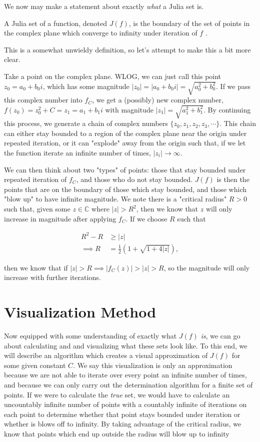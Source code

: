 \documentclass[12pt]{article}
\def\CC{{\mathbb C}}
\begin{document}
We now may make a statement about exactly \textit{what} a Julia set is. 

\begin{defin}
A Julia set of a function, denoted $J(f)$, is the boundary of the set of points in the complex plane which converge to infinity under iteration of $f$ \cite{Milnor}. 
\end{defin}

This is a somewhat unwieldy definition, so let's attempt to make this a bit more clear. 

Take a point on the complex plane. WLOG, we can just call this point $z_0 = a_0 + b_0i$, which has some magnitude $|z_0| = |a_0 + b_0i| = \sqrt{a_0^2 + b_0^2}$. If we pass this complex number into $f_C$, we get a (possibly) new complex number, $f(z_0) = z_0^2 + C = z_1 = a_1 + b_1i$ with magnitude $|z_1| = \sqrt{a_1^2 + b_1^2}$. By continuing this process, we generate a chain of complex numbers $\{ z_0, z_1, z_2, z_3, \cdots \}$. This chain can either stay bounded to a region of the complex plane near the origin under repeated iteration, or it can "explode" away from the origin such that, if we let the function iterate an infinite number of times, $|z_i|\to\infty$. 

We can then think about two "types" of points: those that stay bounded under repeated iteration of $f_C$, and those who do not stay bounded. $J(f)$ is then the points that are on the boundary of those which stay bounded, and those which "blow up" to have infinite magnitude. We note there is a "critical radius" $R > 0$ such that, given some $z\in\CC$ where $|z| > R^2$, then we know that $z$ will only increase in magnitude after applying $f_C$. If we choose $R$ such that

\begin{align*}
R^2 - R &\geq |z| \\
\implies R &= \frac{1}{2}\left(1+\sqrt{1 + 4|z|} \right),
\end{align*}

then we know that if $|z| > R \implies |f_C(z)| > |z| > R$, so the magnitude will only increase with further iterations. 

\section{Visualization Method}

Now equipped with some understanding of exactly what $J(f)$ \textit{is}, we can go about calculating and and visualizing what these sets look like. To this end, we will describe an algorithm which creates a visual approximation of $J(f)$ for some given constant $C$. We say this visualization is only an approximation because we are not able to iterate over every point an infinite number of times, and because we can only carry out the determination algorithm for a finite set of points. If we were to calculate the \textit{true} set, we would have to calculate an uncountably infinite number of points with a countably infinite of iterations on each point to determine whether that point stays bounded under iteration or whether is blows off to infinity. By taking advantage of the critical radius, we know that points which end up outside the radius will blow up to infinity
\end{document}
